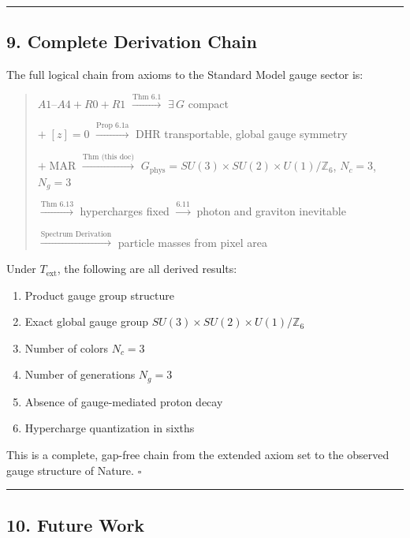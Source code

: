 \begin{center}\rule{0.5\linewidth}{0.5pt}\end{center}

\subsection{9. Complete Derivation Chain}\label{9-complete-derivation-chain}

The full logical chain from axioms to the Standard Model gauge sector is:

\begin{quote}
\(A1\)--\(A4 + R0 + R1\) \(\xrightarrow{\text{Thm 6.1}}\) \(\exists\, G\) compact

\(+ \; [z]=0\) \(\xrightarrow{\text{Prop 6.1a}}\) DHR transportable, global gauge symmetry

\(+ \;\text{MAR}\) \(\xrightarrow{\text{Thm (this doc)}}\) \(G_{\mathrm{phys}} = SU(3) \times SU(2) \times U(1)/\mathbb{Z}_6\), \(N_c = 3\), \(N_g = 3\)

\(\xrightarrow{\text{Thm 6.13}}\) hypercharges fixed \(\xrightarrow{\text{6.11}}\) photon and graviton inevitable

\(\xrightarrow{\text{Spectrum Derivation}}\) particle masses from pixel area
\end{quote}

Under \(T_{\mathrm{ext}}\), the following are all derived results:

\begin{enumerate}
\def\labelenumi{\arabic{enumi}.}
\tightlist
\item
  Product gauge group structure
\item
  Exact global gauge group \(SU(3) \times SU(2) \times U(1)/\mathbb{Z}_6\)
\item
  Number of colors \(N_c = 3\)
\item
  Number of generations \(N_g = 3\)
\item
  Absence of gauge-mediated proton decay
\item
  Hypercharge quantization in sixths
\end{enumerate}

This is a complete, gap-free chain from the extended axiom set to the observed gauge structure of Nature. \(\square\)

\begin{center}\rule{0.5\linewidth}{0.5pt}\end{center}

\subsection{10. Future Work}\label{10-future-work}

